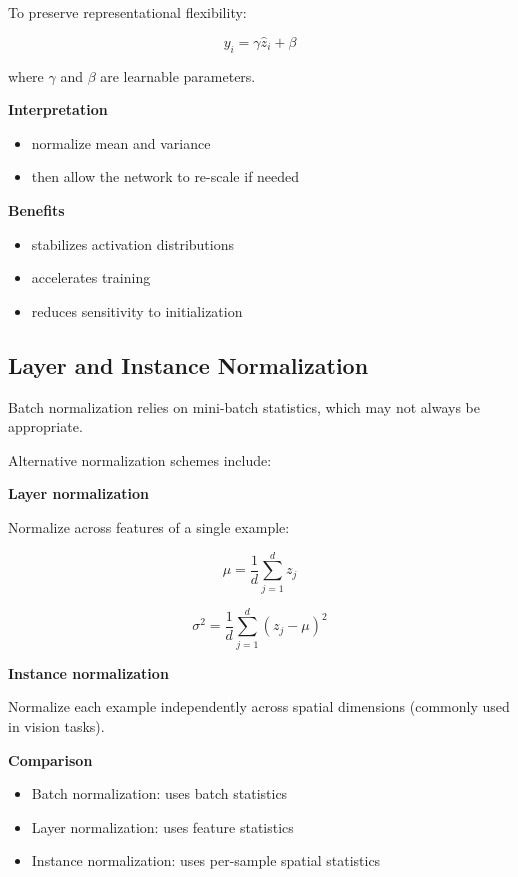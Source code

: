 To preserve representational flexibility:

\[
y_i = \gamma \hat{z}_i + \beta
\]

where $\gamma$ and $\beta$ are learnable parameters.

\medskip

\textbf{Interpretation}

\begin{itemize}
\item normalize mean and variance
\item then allow the network to re-scale if needed
\end{itemize}

\medskip

\textbf{Benefits}

\begin{itemize}
\item stabilizes activation distributions
\item accelerates training
\item reduces sensitivity to initialization
\end{itemize}

\subsection{Layer and Instance Normalization}

Batch normalization relies on mini-batch statistics, which may not always be appropriate.

\medskip

Alternative normalization schemes include:

\textbf{Layer normalization}

Normalize across features of a single example:

\[
\mu = \frac{1}{d}\sum_{j=1}^{d} z_j
\]

\[
\sigma^2 = \frac{1}{d}\sum_{j=1}^{d}(z_j-\mu)^2
\]

\medskip

\textbf{Instance normalization}

Normalize each example independently across spatial dimensions (commonly used in vision tasks).

\medskip

\textbf{Comparison}

\begin{itemize}
\item Batch normalization: uses batch statistics
\item Layer normalization: uses feature statistics
\item Instance normalization: uses per-sample spatial statistics
\end{itemize}

